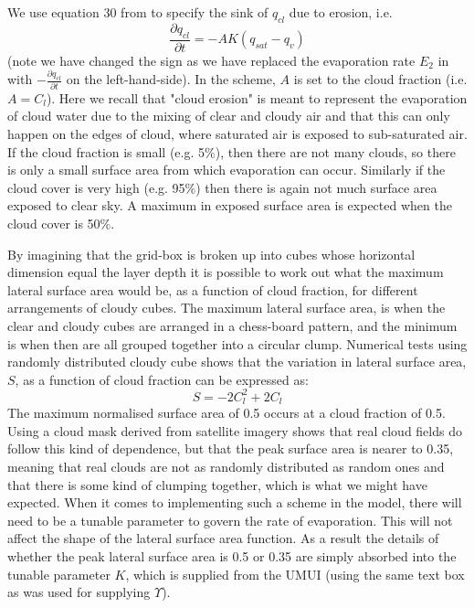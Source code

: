 \documentclass{UMDP_article}
\begin{document}
We use equation 30 from \cite{t93} to specify the sink of $q_{cl}$ due to erosion, i.e.
\begin{equation}
\frac{\partial q_{cl}}{\partial t}=-A K(q_{sat}-q_v)
\label{eq:dqcldt_hybrid}
\end{equation}
(note we have changed the sign as we have replaced the evaporation rate $E_2$
in \cite{t93} with $-\frac{\partial q_{cl}}{\partial t}$ on the left-hand-side).
In the \cite{t93} scheme, $A$ is set to the cloud fraction (i.e. $A=C_l$). 
Here we recall that "cloud erosion" is meant to represent the evaporation of cloud water due to the 
mixing of clear and cloudy air and that this can only happen on the edges of cloud, where saturated air is exposed to sub-saturated air. 
If the cloud fraction is small (e.g. 5$\%$), then there are not many clouds, so there is only a small surface area from which evaporation can occur. 
Similarly if the cloud cover is very high (e.g. 95$\%$) then there is again not much surface area exposed to clear sky. 
A maximum in exposed surface area is expected when the cloud cover is 50$\%$.

By imagining that the grid-box is broken up into cubes whose horizontal dimension equal the layer depth it is possible 
to work out what the maximum lateral surface area would be, as a function of cloud fraction, for different arrangements of cloudy cubes. 
The maximum lateral surface area, is when the clear and cloudy cubes are arranged in a chess-board pattern, and the minimum is when then are all grouped 
together into a circular clump. Numerical tests using randomly distributed cloudy cube shows that the variation 
in lateral surface area, $S$, as a function of cloud fraction can be expressed as:
\begin{equation}
S= - 2 C_l ^{2} + 2 C_l
\label{eq:S_Cl} \end{equation}
The maximum normalised surface area of 0.5 occurs at a cloud fraction of 0.5.
Using a cloud mask derived from satellite imagery shows that real cloud fields do follow this kind of dependence, 
but that the peak surface area is nearer to 0.35, meaning that real clouds are not as randomly distributed as random 
ones and that there is some kind of clumping together, which is what we might have expected.
When it comes to implementing such a scheme in the model, there will need to be a tunable parameter to govern the 
rate of evaporation. This will not affect the shape of the lateral surface area function. 
As a result the details of whether the peak lateral surface area is 0.5 or 0.35 are simply absorbed into the tunable parameter $K$, 
which is supplied from the UMUI (using the same text box as was used for supplying $\Upsilon$).
\end{document}
